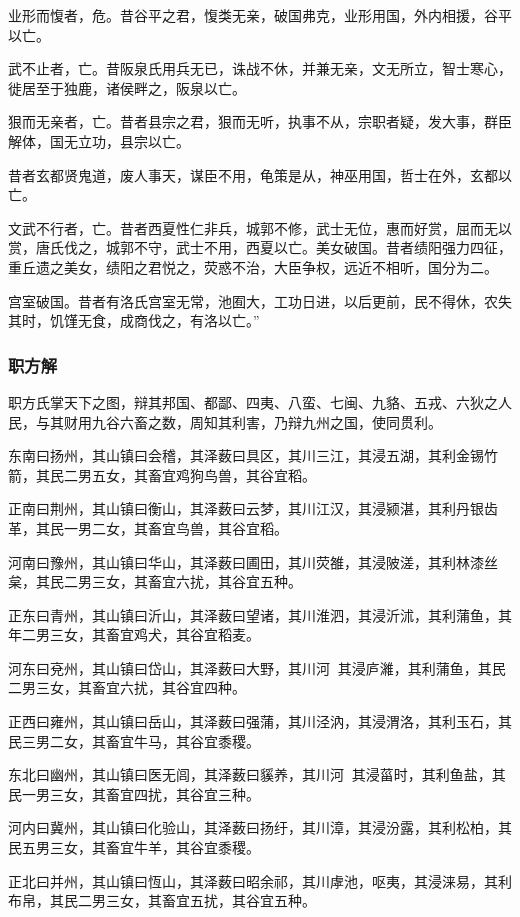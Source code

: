 \documentclass[]{article}
\begin{document}
业形而愎者，危。昔谷平之君，愎类无亲，破国弗克，业形用国，外内相援，谷平以亡。

武不止者，亡。昔阪泉氏用兵无已，诛战不休，并兼无亲，文无所立，智士寒心，徙居至于独鹿，诸侯畔之，阪泉以亡。

狠而无亲者，亡。昔者县宗之君，狠而无听，执事不从，宗职者疑，发大事，群臣解体，国无立功，县宗以亡。

昔者玄都贤鬼道，废人事天，谋臣不用，龟策是从，神巫用国，哲士在外，玄都以亡。

文武不行者，亡。昔者西夏性仁非兵，城郭不修，武士无位，惠而好赏，屈而无以赏，唐氏伐之，城郭不守，武士不用，西夏以亡。美女破国。昔者绩阳强力四征，重丘遗之美女，绩阳之君悦之，荧惑不治，大臣争权，远近不相听，国分为二。

宫室破国。昔者有洛氏宫室无常，池囿大，工功日进，以后更前，民不得休，农失其时，饥馑无食，成商伐之，有洛以亡。''

\hypertarget{header-n335}{%
\subsubsection{职方解}\label{header-n335}}

职方氏掌天下之图，辩其邦国、都鄙、四夷、八蛮、七闽、九貉、五戎、六狄之人民，与其财用九谷六畜之数，周知其利害，乃辩九州之国，使同贯利。

东南曰扬州，其山镇曰会稽，其泽薮曰具区，其川三江，其浸五湖，其利金锡竹箭，其民二男五女，其畜宜鸡狗鸟兽，其谷宜稻。

正南曰荆州，其山镇曰衡山，其泽薮曰云梦，其川江汉，其浸颍湛，其利丹银齿革，其民一男二女，其畜宜鸟兽，其谷宜稻。

河南曰豫州，其山镇曰华山，其泽薮曰圃田，其川荧雒，其浸陂溠，其利林漆丝枲，其民二男三女，其畜宜六扰，其谷宜五种。

正东曰青州，其山镇曰沂山，其泽薮曰望诸，其川淮泗，其浸沂沭，其利蒲鱼，其年二男三女，其畜宜鸡犬，其谷宜稻麦。

河东曰兗州，其山镇曰岱山，其泽薮曰大野，其川河，其浸庐濰，其利蒲鱼，其民二男三女，其畜宜六扰，其谷宜四种。

正西曰雍州，其山镇曰岳山，其泽薮曰强蒲，其川泾汭，其浸渭洛，其利玉石，其民三男二女，其畜宜牛马，其谷宜黍稷。

东北曰幽州，其山镇曰医无闾，其泽薮曰貕养，其川河，其浸菑时，其利鱼盐，其民一男三女，其畜宜四扰，其谷宜三种。

河内曰冀州，其山镇曰化验山，其泽薮曰扬纡，其川漳，其浸汾露，其利松柏，其民五男三女，其畜宜牛羊，其谷宜黍稷。

正北曰并州，其山镇曰恆山，其泽薮曰昭余祁，其川虖池，呕夷，其浸涞易，其利布帛，其民二男三女，其畜宜五扰，其谷宜五种。
\end{document}
